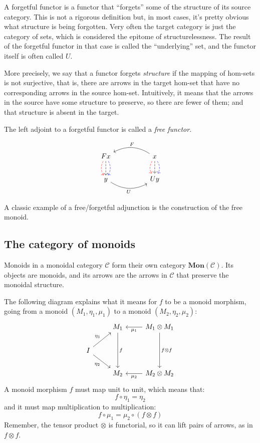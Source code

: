 \documentclass[DaoFP]{subfiles}
\begin{document}
A forgetful functor is a functor that ``forgets'' some of the structure of its source category. This is not a rigorous definition but, in most cases, it's pretty obvious what structure is being forgotten. Very often the target category is just the category of sets, which is considered the epitome of structurelessness. The result of the forgetful functor in that case is called the ``underlying'' set, and the functor itself is often called $U$. 

More precisely, we say that a functor forgets \emph{structure} if the mapping of hom-sets is not surjective, that is, there are arrows in the target hom-set that have no corresponding arrows in the source hom-set. Intuitively, it means that the arrows in the source have some structure to preserve, so there are fewer of them; and that structure is absent in the target. 

The left adjoint to a forgetful functor is called a \emph{free functor}.

\[
 \begin{tikzcd}
F x
\arrow[d, bend right, red, dashed]
\arrow[d, dashed]
\arrow[d, bend left, blue, dashed]
  &&
  x
\arrow[d, bend right, red, dashed]
\arrow[d, dashed]
\arrow[d, bend left, blue, dashed]
 \arrow[ll, bend right, "F"']
 \\
y
   \arrow[rr, bend right, "U"']
 &&
 U y
  \end{tikzcd}
\]

A classic example of a free/forgetful adjunction is the construction of the free monoid.


\subsection{The category of monoids}
Monoids in a monoidal category $\mathcal{C}$ form their own category $\mathbf{Mon}(\mathcal{C})$. Its objects are monoids, and its arrows are the arrows in $\mathcal{C}$ that preserve the monoidal structure. 

The following diagram explains what it means for $f$ to be a monoid morphism, going from a monoid $(M_1, \eta_1, \mu_1)$ to a monoid $(M_2, \eta_2, \mu_2)$:
\[
 \begin{tikzcd}
 & M_1
 \arrow[dd, "f"]
 & M_1 \otimes M_1
 \arrow[l, "\mu_1"]
 \arrow[dd, "f \otimes f"]
 \\
 I
 \arrow[ru, "\eta_1"]
 \arrow[rd, "\eta_2"']
 \\
 & M_2
 & M_2 \otimes M_2
 \arrow[l, "\mu_2"]
  \end{tikzcd}
\]
A monoid morphism $f$ must map unit to unit, which means that:
\[ f \circ \eta_1 = \eta_2 \]
and it must map multiplication to multiplication:
\[ f \circ \mu_1 = \mu_2 \circ (f \otimes f)\]
Remember, the tensor product $\otimes$ is functorial, so it can lift pairs of arrows, as in $f \otimes f$.
\end{document}
